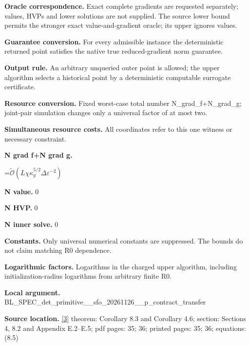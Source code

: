\documentclass[10pt,a4paper]{article}
\newcommand{\AtlasMath}[1]{\par\begingroup\centering\setbox0=\hbox{$\displaystyle #1$}\ifdim\wd0>1.4\linewidth\typeout{ATLAS WIDE FORMULA: \the\wd0}\fi\ifdim\wd0>\linewidth\resizebox{\linewidth}{!}{\box0}\else\box0\fi\par\endgroup}
\begin{document}
\textbf{Oracle correspondence.} Exact complete gradients are requested separately; values, HVPs and lower solutions are not supplied. The source lower bound permits the stronger exact value-and-gradient oracle; its upper ignores values.



\textbf{Guarantee conversion.} For every admissible instance the deterministic returned point satisfies the native true reduced-gradient norm guarantee.



\textbf{Output rule.} An arbitrary unqueried outer point is allowed; the upper algorithm selects a historical point by a deterministic computable surrogate certificate.



\textbf{Resource conversion.} Fixed worst-case total number N\_grad\_f+N\_grad\_g; joint-pair simulation changes only a universal factor of at most two.



\textbf{Simultaneous resource costs.} All coordinates refer to this one witness or necessary constraint.



\textbf{N grad f+N grad g.}



\AtlasMath{\widetilde{\mathcal O}\!\left(L\chi\kappa_g^{5/2}\Delta\varepsilon^{-2}\right)}


\textbf{N value.} 0



\textbf{N HVP.} 0



\textbf{N inner solve.} 0



\textbf{Constants.} Only universal numerical constants are suppressed. The bounds do not claim matching R0 dependence.



\textbf{Logarithmic factors.} Logarithms in the charged upper algorithm, including initialization-radius logarithms from arbitrary finite R0.



\textbf{Local argument.} BL\_SPEC\_det\_primitive\_\_s\allowbreak{}fo\_20261126\_\_p\_contract\_\allowbreak{}transfer



\textbf{Source location.} \href{https://github.com/WU-Wendao/Colombo/blob/main/colombo_sensorium/Complexity_altas/data/sources/colombo/SFO_JOINT_20261126/manuscript.pdf}{[3]} theorem: Corollary 8.3 and Corollary 4.6; section: Sections 4, 8.2 and Appendix E.2--E.5; pdf pages: 35; 36; printed pages: 35; 36; equations: (8.5)
\end{document}
